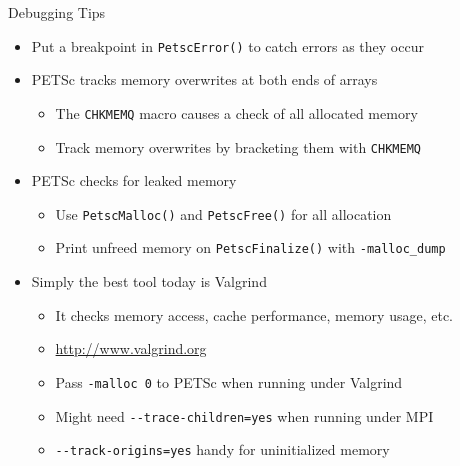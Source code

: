 \begin{frame}{Debugging Tips}

\begin{itemize}
  \item Put a breakpoint in \lstinline|PetscError()| to catch errors as they occur

  \vspace*{0.3cm}
  \item PETSc tracks memory overwrites at both ends of arrays
  \begin{itemize}
    \item The \lstinline|CHKMEMQ| macro causes a check of all allocated memory

    \item Track memory overwrites by bracketing them with \lstinline|CHKMEMQ|
  \end{itemize}

  \vspace*{0.3cm}
  \item PETSc checks for leaked memory
  \begin{itemize}
    \item Use \lstinline|PetscMalloc()| and \lstinline|PetscFree()| for all allocation

    \item Print unfreed memory on \lstinline|PetscFinalize()| with \lstinline|-malloc_dump|
  \end{itemize}

  \vspace*{0.3cm}
  \item Simply the best tool today is {\color{red} Valgrind}
  \begin{itemize}
    \item It checks memory access, cache performance, memory usage, etc.

    \item \href{http://www.valgrind.org}{http://www.valgrind.org}

    \item Pass \lstinline|-malloc 0| to PETSc when running under Valgrind
    \item Might need \lstinline|--trace-children=yes| when running under MPI
    \item \lstinline|--track-origins=yes| handy for uninitialized memory
  \end{itemize}
\end{itemize}

\end{frame}
